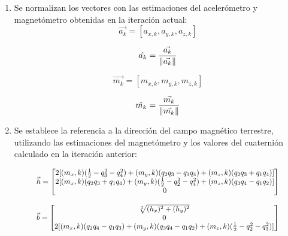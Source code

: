     \begin{enumerate}
        \item Se normalizan los vectores con las estimaciones del acelerómetro y magnetómetro obtenidas en la iteración actual:
        \begin{equation}
             \vec{a_k} = [a_{x,k}, a_{y,k}, a_{z,k}]  
        \end{equation}

        \begin{equation}
            \hat{a_k} = \frac{\vec{a_k}}{\lVert\vec{a_k}\rVert}  
        \end{equation}

        \begin{equation}
            \vec{m_k} = [m_{x,k}, m_{y,k}, m_{z,k}] 
        \end{equation}

        \begin{equation}
            \hat{m_k} = \frac{\vec{m_k}}{\lVert\vec{m_k}\rVert} 
        \end{equation}
            
        
        \item Se establece la referencia a la dirección del campo magnético terrestre, utilizando las estimaciones del magnetómetro y los valores del cuaternión calculado en la iteración anterior:
        
        \begin{equation}
            \resizebox{0.84\hsize}{!}{$
            \vec{h} = 
                \begin{bmatrix}
                    2[(m_x,k)(\frac{1}{2} - q^2_3 - q^2_4 ) + (m_y,k)(q_2q_3 - q_1q_4) + (m_z,k)(q_2q_3 + q_1q_4)] \\
                    2[(m_x,k)(q_2q_3 + q_1q_4) + (m_y,k)(\frac{1}{2} - q^2_2 - q^2_4 ) + (m_z,k)(q_3q_4 - q_1q_2)] \\
                    0 
                \end{bmatrix} 
            $}    
        \end{equation}
        
        
        \begin{equation}
        \resizebox{0.84\hsize}{!}{$
            \vec{b} = 
                \begin{bmatrix}
                    \sqrt[2]{(h_x)^2+(h_y)^2}  \\
                    0 \\
                    2[(m_x,k)(q_2q_4 - q_1q_3) + (m_y,k)(q_3q_4 - q_1q_2) + (m_z,k)(\frac{1}{2} - q^2_2 - q^2_3 )] 
                \end{bmatrix} 
            $}
        \end{equation}
            

\end{enumerate}
